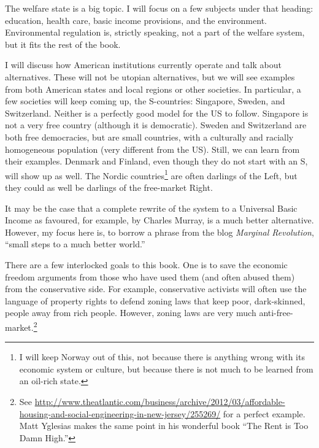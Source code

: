 \bigskip
\bigskip

The welfare state is a big topic. I will focus on a few subjects under that
heading: education, health care, basic income provisions, and the environment.
Environmental regulation is, strictly speaking, not a part of the welfare
system, but it fits the rest of the book.

I will discuss how American institutions currently operate and talk about
alternatives. These will not be utopian alternatives, but we will see examples
from both American states and local regions or other societies. In particular,
a few societies will keep coming up, the S-countries: Singapore, Sweden, and
Switzerland. Neither is a perfectly good model for the US to follow. Singapore
is not a very free country (although it is democratic). Sweden and Switzerland
are both free democracies, but are small countries, with a culturally and
racially homogeneous population (very different from the US). Still, we can
learn from their examples. Denmark and Finland, even though they do not start
with an S, will show up as well. The Nordic countries\footnote{I will keep
Norway out of this, not because there is anything wrong with its economic
system or culture, but because there is not much to be learned from an oil-rich
state.} are often darlings of the Left, but they could as well be darlings of
the free-market Right.

It may be the case that a complete rewrite of the system to a Universal Basic
Income as favoured, for example, by Charles Murray, is a much better
alternative. However, my focus here is, to borrow a phrase from the blog
\emph{Marginal Revolution}, ``small steps to a much better world.''

\bigskip
\bigskip

There are a few interlocked goals to this book. One is to save the economic
freedom arguments from those who have used them (and often abused them) from
the conservative side. For example, conservative activists will often use the
language of property rights to defend zoning laws that keep poor, dark-skinned,
people away from rich people. However, zoning laws are very much
anti-free-market.\footnote{See
\url{http://www.theatlantic.com/business/archive/2012/03/affordable-housing-and-social-engineering-in-new-jersey/255269/}
for a perfect example. Matt Yglesias makes the same point in his wonderful book
``The Rent is Too Damn High.''} %

